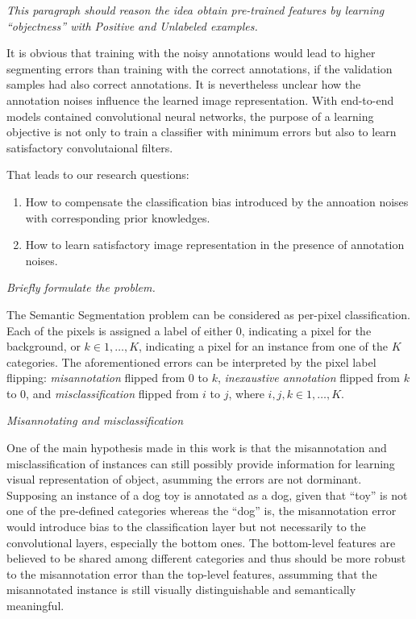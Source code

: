 \noindent
\textit{This paragraph should reason the idea obtain pre-trained features by learning ``objectness'' with Positive and Unlabeled examples.}

\noindent
It is obvious that training with the noisy annotations would lead to higher segmenting errors than training with the correct annotations, if the validation samples had also correct annotations. It is nevertheless unclear how the annotation noises influence the learned image representation.
With end-to-end models contained convolutional neural networks, the purpose of a learning objective is not only to train a classifier with minimum errors but also to learn satisfactory convolutaional filters.

\noindent
That leads to our research questions:
\begin{enumerate}
  \item How to compensate the classification bias introduced by the annoation noises with corresponding prior knowledges.
  \item How to learn satisfactory image representation in the presence of annotation noises.
\end{enumerate}


\noindent
\textit{Briefly formulate the problem.}

\noindent
The Semantic Segmentation problem can be considered as per-pixel classification. Each of the pixels is assigned a label of either $0$, indicating a pixel for the background, or $k \in {1, \ldots, K}$, indicating a pixel for an instance from one of the $K$ categories.
The aforementioned errors can be interpreted by the pixel label flipping:
\textit{misannotation} flipped from $0$ to $k$, \textit{inexaustive annotation} flipped from $k$ to $0$, and \textit{misclassification} flipped from $i$ to $j$, where $i, j, k \in {1, \ldots, K}$.

\noindent
\textit{Misannotating and misclassification}

\noindent
One of the main hypothesis made in this work is that the misannotation and misclassification of instances can still possibly provide information for learning visual representation of object, asumming the errors are not dorminant.
Supposing an instance of a dog toy is annotated as a dog, given that ``toy'' is not one of the pre-defined categories whereas the ``dog'' is, the misannotation error would introduce bias to the classification layer but not necessarily to the convolutional layers, especially the bottom ones.
The bottom-level features are believed to be shared among different categories and thus should be more robust to the misannotation error than the top-level features, assumming that the misannotated instance is still visually distinguishable and semantically meaningful.


